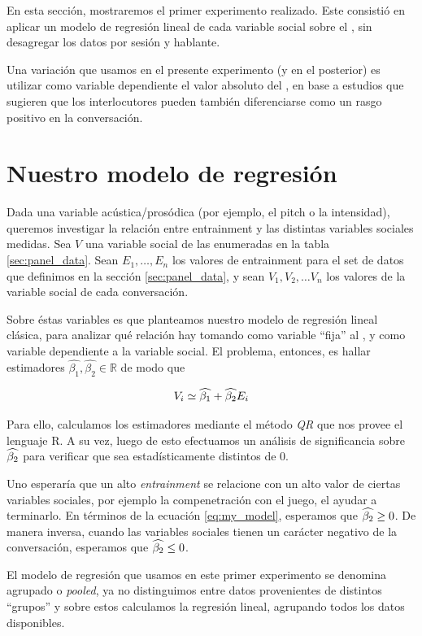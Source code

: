 En esta sección, mostraremos el primer experimento realizado. Este consistió en aplicar un modelo de regresión lineal de cada variable social sobre el \entrainment, sin desagregar los datos por sesión y hablante.

Una variación que usamos en el presente experimento (y en el posterior) es utilizar como variable dependiente el valor absoluto del \entrainment, en base a estudios que sugieren que los interlocutores pueden también diferenciarse como un rasgo positivo en la conversación.

\section{Nuestro modelo de regresión}

Dada una variable acústica/prosódica (por ejemplo, el pitch o la intensidad), queremos investigar la relación entre entrainment y las distintas variables sociales medidas. Sea $V$ una variable social de las enumeradas en la tabla \ref{sec:panel_data}. Sean $E_1, \ldots, E_n$ los valores de entrainment para el set de datos que definimos en la sección \ref{sec:panel_data}, y sean $V_1, V_2, \ldots V_n$ los valores de la variable social de cada conversación.

Sobre éstas variables es que planteamos nuestro modelo de regresión lineal clásica, para analizar qué relación hay tomando como variable ``fija'' al \entrainment, y como variable dependiente a la variable social. El problema, entonces, es hallar estimadores $\widehat{\beta_1}, \widehat{\beta_2} \in \mathbb{R}$ de modo que 

\begin{equation}
  V_i \simeq \widehat{\beta_1} + \widehat{\beta_2} E_i
  \label{eq:my_model}
\end{equation}


Para ello, calculamos los estimadores mediante el método \emph{QR} que nos provee el lenguaje R. A su vez, luego de esto efectuamos un análisis de significancia sobre $\widehat{\beta_2}$ para verificar que sea estadísticamente distintos de 0.

Uno esperaría que un alto \emph{entrainment} se relacione con un alto valor de ciertas variables sociales, por ejemplo la compenetración con el juego, el ayudar a terminarlo. En términos de la ecuación \ref{eq:my_model}, esperamos que $\widehat{\beta_2} \geq 0$. De manera inversa, cuando las variables sociales tienen un carácter negativo de la conversación, esperamos que $\widehat{\beta_2} \leq 0$. 


El modelo de regresión que usamos en este primer experimento se denomina agrupado o \emph{pooled}, ya no distinguimos entre datos provenientes de distintos ``grupos'' \cite{gujarati1999} y sobre estos calculamos la regresión lineal, agrupando todos los datos disponibles.

